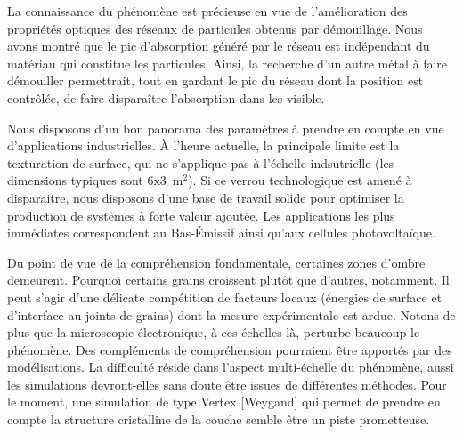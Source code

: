 La connaissance du phénomène est précieuse en vue de l'amélioration des propriétés optiques des réseaux de particules obtenus par démouillage. Nous avons montré que le pic d'absorption généré par le réseau est indépendant du matériau qui constitue les particules. Ainsi, la recherche d'un autre métal à faire démouiller permettrait, tout en gardant le pic du réseau dont la position est contrôlée, de faire disparaître l'absorption dans les visible.\par 
Nous disposons d'un bon panorama des paramètres à prendre en compte en vue d'applications industrielles. À l'heure actuelle, la principale limite est la texturation de surface, qui ne s'applique pas à l'échelle indsutrielle (les dimensions typiques sont 6x3~m$^2$). Si ce verrou technologique est amené à disparaitre, nous disposons d'une base de travail solide pour optimiser la production de systèmes à forte valeur ajoutée. Les applications les plus immédiates correspondent au Bas-Émissif ainsi qu'aux cellules photovoltaïque.\par 

\vspace{12pt}
Du point de vue de la compréhension fondamentale, certaines zones d'ombre demeurent. Pourquoi certains grains croissent plutôt que d'autres, notamment. Il peut s'agir d'une délicate compétition de facteurs locaux (énergies de surface et d'interface au joints de grains) dont la mesure expérimentale est ardue. Notons de plus que la microscopie électronique, à ces échelles-là, perturbe beaucoup le phénomène. Des compléments de compréhension pourraient être apportés par des modélisations. La difficulté réside dans l'aspect multi-échelle du phénomène, aussi les simulations devront-elles sans doute être issues de différentes méthodes. Pour le moment, une simulation de type Vertex [Weygand] qui permet de prendre en compte la structure cristalline de la couche semble être un piste prometteuse.\par 
